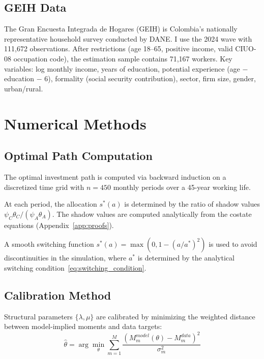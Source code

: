 \documentclass[11pt,a4paper]{article}
\theoremstyle{definition}
\begin{document}
\subsection{GEIH Data}

The Gran Encuesta Integrada de Hogares (GEIH) is Colombia's nationally representative household survey conducted by DANE. I use the 2024 wave with 111,672 observations. After restrictions (age 18--65, positive income, valid CIUO-08 occupation code), the estimation sample contains 71,167 workers. Key variables: log monthly income, years of education, potential experience (age $-$ education $-$ 6), formality (social security contribution), sector, firm size, gender, urban/rural.


\section{Numerical Methods}
\label{app:numerical}

\subsection{Optimal Path Computation}

The optimal investment path is computed via backward induction on a discretized time grid with $n = 450$ monthly periods over a 45-year working life.

At each period, the allocation $s^*(a)$ is determined by the ratio of shadow values $\psi_C \theta_C / (\psi_A \theta_A)$. The shadow values are computed analytically from the costate equations (Appendix~\ref{app:proofs}).

A smooth switching function $s^*(a) = \max(0, 1 - (a/a^*)^2)$ is used to avoid discontinuities in the simulation, where $a^*$ is determined by the analytical switching condition~\eqref{eq:switching_condition}.

\subsection{Calibration Method}

Structural parameters $\{\lambda, \mu\}$ are calibrated by minimizing the weighted distance between model-implied moments and data targets:
\begin{equation}
\hat{\theta} = \arg\min_{\theta} \sum_{m=1}^M \frac{(M_m^{model}(\theta) - M_m^{data})^2}{\sigma_m^2}
\end{equation}
\end{document}
